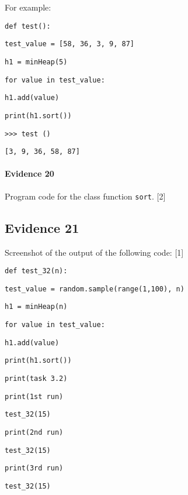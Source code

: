 For example: 

\noindent %
\noindent\begin{minipage}[t]{1\columnwidth}%
\texttt{def test(): }

\texttt{\qquad{}test\_value = {[}58, 36, 3, 9, 87{]}}

\texttt{\qquad{}h1 = minHeap(5) }

\texttt{\qquad{}for value in test\_value: }

\texttt{\qquad{}\qquad{}h1.add(value) }

\texttt{\qquad{}print(h1.sort())}

\texttt{>\textcompwordmark >\textcompwordmark > test () }

\texttt{{[}3, 9, 36, 58, 87{]} }%
\end{minipage}

\paragraph*{Evidence 20}

Program code for the class function \texttt{sort}. \hfill{} {[}2{]}

\subsection*{Evidence 21}

Screenshot of the output of the following code: \hfill{}{[}1{]}

\noindent %
\noindent\begin{minipage}[t]{1\columnwidth}%
\texttt{def test\_32(n): }

\texttt{\qquad{}test\_value = random.sample(range(1,100), n)}

\texttt{\qquad{}h1 = minHeap(n)}

\texttt{\qquad{}for value in test\_value:}

\texttt{\qquad{}\qquad{}h1.add(value)}

\texttt{\qquad{}print(h1.sort())\bigskip{}
}

\texttt{print(\textquotedbl task 3.2\textquotedbl ) }

\texttt{print(\textquotedbl 1st run\textquotedbl ) }

\texttt{test\_32(15)}

\texttt{print(\textquotedbl 2nd run\textquotedbl )}

\texttt{test\_32(15) }

\texttt{print(\textquotedbl 3rd run\textquotedbl )}

\texttt{test\_32(15) }%
\end{minipage}

